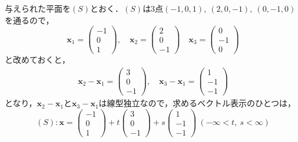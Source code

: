 \documentclass[a4paper,10pt,fleqn]{ltjsarticle}
\begin{document}
\begin{tleftbar}
    与えられた平面を$(S)$とおく．$(S)$は3点$(-1,0,1),~(2,0,-1),~(0,-1,0)$を通るので，
    \begin{equation*}
        \bm{x}_1=
        \begin{pmatrix}
            -1 \\
            0  \\
            1
        \end{pmatrix}
        ,\quad \bm{x}_2=
        \begin{pmatrix}
            2 \\
            0 \\
            -1
        \end{pmatrix}
        \quad
        \bm{x}_3=
        \begin{pmatrix}
            0  \\
            -1 \\
            0
        \end{pmatrix}
    \end{equation*}
    と改めておくと，
    \begin{gather*}
        \bm{x}_2 - \bm{x}_1 =
        \begin{pmatrix}
            3 \\
            0 \\
            -1
        \end{pmatrix}
        ,\quad
        \bm{x}_3 - \bm{x}_1 =
        \begin{pmatrix}
            1  \\
            -1 \\
            -1
        \end{pmatrix}
    \end{gather*}
    となり，$\bm{x}_2 - \bm{x}_1$と$\bm{x}_3 - \bm{x}_1$は線型独立なので，求めるベクトル表示のひとつは，
    \[
        (S) \colon \bm{x}=
        \begin{pmatrix}
            -1 \\
            0  \\
            1
        \end{pmatrix}
        + t
        \begin{pmatrix}
            3 \\
            0 \\
            -1
        \end{pmatrix}
        +s
        \begin{pmatrix}
            1  \\
            -1 \\
            -1
        \end{pmatrix}
        ~( -\infty < t,~s<\infty)
    \]
\end{tleftbar}
%
%
%
%
\end{document}
